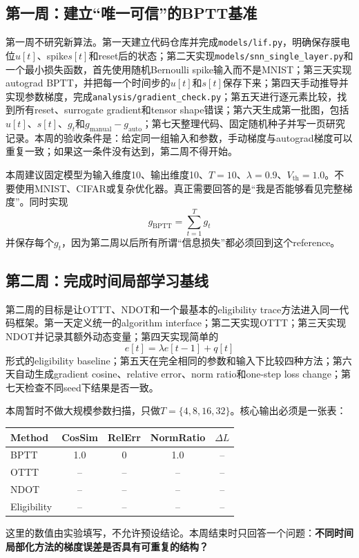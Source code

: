 \documentclass[journal,12pt,onecolumn]{IEEEtran}
\begin{document}
\subsection{第一周：建立“唯一可信”的BPTT基准}

第一周不研究新算法。第一天建立代码仓库并完成\verb|models/lif.py|，明确保存膜电位$u[t]$、spike$s[t]$和reset后的状态；第二天实现\verb|models/snn_single_layer.py|和一个最小损失函数，首先使用随机Bernoulli spike输入而不是MNIST；第三天实现autograd BPTT，并把每一个时间步的$u[t]$和$s[t]$保存下来；第四天手动推导并实现参数梯度，完成\verb|analysis/gradient_check.py|；第五天进行逐元素比较，找到所有reset、surrogate gradient和tensor shape错误；第六天生成第一批图，包括$u[t]$、$s[t]$、$g_t$和$g_{\mathrm{manual}}-g_{\mathrm{auto}}$；第七天整理代码、固定随机种子并写一页研究记录。本周的验收条件是：给定同一组输入和参数，手动梯度与autograd梯度可以重复一致；如果这一条件没有达到，第二周不得开始。

本周建议固定模型为输入维度10、输出维度10、$T=10$、$\lambda=0.9$、$V_{\mathrm{th}}=1.0$。不要使用MNIST、CIFAR或复杂优化器。真正需要回答的是“我是否能够看见完整梯度”。同时实现
\begin{equation}
g_{\mathrm{BPTT}}=\sum_{t=1}^{T}g_t
\end{equation}
并保存每个$g_t$，因为第二周以后所有所谓“信息损失”都必须回到这个reference。

\subsection{第二周：完成时间局部学习基线}

第二周的目标是让OTTT、NDOT和一个最基本的eligibility trace方法进入同一代码框架。第一天定义统一的algorithm interface；第二天实现OTTT；第三天实现NDOT并记录其额外动态变量；第四天实现简单的
\begin{equation}
e[t]=\lambda e[t-1]+q[t]
\end{equation}
形式的eligibility baseline；第五天在完全相同的参数和输入下比较四种方法；第六天自动生成gradient cosine、relative error、norm ratio和one-step loss change；第七天检查不同seed下结果是否一致。

本周暂时不做大规模参数扫描，只做$T=\{4,8,16,32\}$。核心输出必须是一张表：
\begin{center}
\begin{tabular}{lcccc}
\toprule
Method & CosSim & RelErr & NormRatio & $\Delta L$\\
\midrule
BPTT & 1.0 & 0 & 1.0 & --\\
OTTT & -- & -- & -- & --\\
NDOT & -- & -- & -- & --\\
Eligibility & -- & -- & -- & --\\
\bottomrule
\end{tabular}
\end{center}
这里的数值由实验填写，不允许预设结论。本周结束时只回答一个问题：\textbf{不同时间局部化方法的梯度误差是否具有可重复的结构？}
\end{document}
